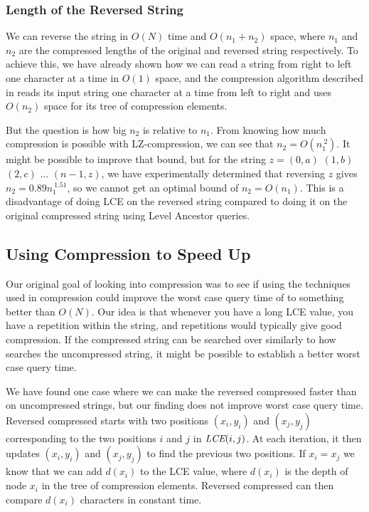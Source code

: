 \documentclass[a4]{article}
\newcommand*{\pref}{\prettyref}
\begin{document}
\subsubsection{Length of the Reversed String}

We can reverse the string in $O(N)$ time and $O(n_1 + n_2)$ space, where $n_1$ and $n_2$ are the compressed lengths of the original and reversed string respectively. To achieve this, we have already shown how we can read a string from right to left one character at a time in $O(1)$ space, and the compression algorithm described in \pref{sec:lz-comp-alg} reads its input string one character at a time from left to right and uses $O(n_2)$ space for its tree of compression elements.

But the question is how big $n_2$ is relative to $n_1$. From knowing how much compression is possible with LZ-compression, we can see that $n_2=O(n_1^{~2})$. It might be possible to improve that bound, but for the string $z=(0,a)$ $(1,b)$ $(2,c)$ $...$ $(n-1,z)$, we have experimentally determined that reversing $z$ gives $n_2=0.89n_1^{~1.51}$, so we cannot get an optimal bound of $n_2=O(n_1)$. This is a disadvantage of doing LCE on the reversed string compared to doing it on the original compressed string using Level Ancestor queries.

\subsection{Using Compression to Speed Up }

Our original goal of looking into compression was to see if using the techniques used in compression could improve the worst case query time of  to something better than $O(N)$. Our idea is that whenever you have a long LCE value, you have a repetition within the string, and repetitions would typically give good compression. If the compressed string can be searched over similarly to how  searches the uncompressed string, it might be possible to establish a better worst case query time.

We have found one case where we can make the reversed compressed  faster than  on uncompressed strings, but our finding does not improve worst case query time. Reversed compressed  starts with two positions $(x_i,y_i)$ and $(x_j,y_j)$ corresponding to the two positions $i$ and $j$ in $\textit{LCE}(i,j)$. At each iteration, it then updates $(x_i,y_i)$ and $(x_j,y_j)$ to find the previous two positions. If $x_i = x_j$ we know that we can add $d(x_i)$ to the LCE value, where $d(x_i)$ is the depth of node $x_i$ in the tree of compression elements. Reversed compressed  can then compare $d(x_i)$ characters in constant time.
\end{document}
